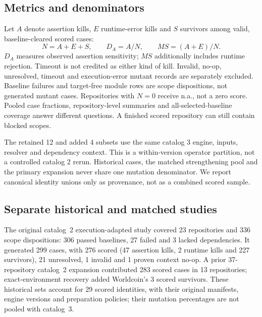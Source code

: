 \subsection{Metrics and denominators}\label{sec:metrics}
Let $A$ denote assertion kills, $E$ runtime-error kills and $S$ survivors among valid, baseline-cleared scored cases:
\begin{equation}
N=A+E+S,\qquad D_A=A/N,\qquad MS=(A+E)/N.\label{eq:score}
\end{equation}
$D_A$ measures observed assertion sensitivity; $MS$ additionally includes runtime rejection. Timeout is not credited as either kind of kill. Invalid, no-op, unresolved, timeout and execution-error mutant records are separately excluded. Baseline failures and target-free module rows are scope dispositions, not generated mutant cases. Repositories with $N=0$ receive n.a., not a zero score. Pooled case fractions, repository-level summaries and all-selected-baseline coverage answer different questions. A finished scored repository can still contain blocked scopes.

The retained 12 and added 4 subsets use the same catalog 3 engine, inputs, resolver and dependency context. This is a within-version operator partition, not a controlled catalog 2 rerun. Historical cases, the matched strengthening pool and the primary expansion never share one mutation denominator. We report canonical identity unions only as provenance, not as a combined scored sample.

\subsection{Separate historical and matched studies}\label{sec:paired}
The original catalog~2 execution-adapted study covered 23 repositories and 336 scope dispositions: 306 passed baselines, 27 failed and 3 lacked dependencies. It generated 299 cases, with 276 scored (47 assertion kills, 2 runtime kills and 227 survivors), 21 unresolved, 1 invalid and 1 proven context no-op. A prior 37-repository catalog~2 expansion contributed 283 scored cases in 13 repositories; exact-environment recovery added Worldcoin's 3 scored survivors. These historical sets account for 29 scored identities, with their original manifests, engine versions and preparation policies; their mutation percentages are not pooled with catalog~3.

